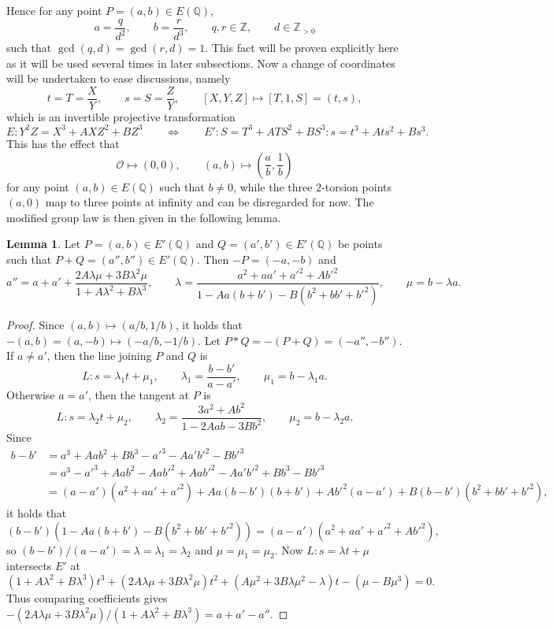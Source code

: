 \documentclass{article}
\newcommand{\Z}{\mathbb{Z}}
\newcommand{\Q}{\mathbb{Q}}
\newcommand{\rb}[1]{\left( #1 \right)}
\renewcommand{\sb}[1]{\left[ #1 \right]}
\theoremstyle{definition}\newtheorem*{definition}{Definition}
\theoremstyle{definition}\newtheorem*{example}{Example}
\theoremstyle{definition}\newtheorem*{remark}{Remark}
\newtheorem{lemma}[proposition]{Lemma}
\begin{document}
Hence for any point $ P = \rb{a, b} \in E\rb{\Q} $,
$$ a = \dfrac{q}{d^2}, \qquad b = \dfrac{r}{d^3}, \qquad q, r \in \Z, \qquad d \in \Z_{> 0} $$
such that $ \gcd\rb{q, d} = \gcd\rb{r, d} = 1 $. This fact will be proven explicitly here as it will be used several times in later subsections. Now a change of coordinates will be undertaken to ease discussions, namely
$$ t = T = \dfrac{X}{Y}, \qquad s = S = \dfrac{Z}{Y}, \qquad \sb{X, Y, Z} \mapsto \sb{T, 1, S} = \rb{t, s}, $$
which is an invertible projective transformation
$$ E : Y^2Z = X^3 + AXZ^2 + BZ^3 \qquad \iff \qquad E' : S = T^3 + ATS^2 + BS^3 : s = t^3 + Ats^2 + Bs^3. $$
This has the effect that
$$ \mathcal{O} \mapsto \rb{0, 0}, \qquad \rb{a, b} \mapsto \rb{\dfrac{a}{b}, \dfrac{1}{b}} $$
for any point $ \rb{a, b} \in E\rb{\Q} $ such that $ b \ne 0 $, while the three $ 2 $-torsion points $ \rb{a, 0} $ map to three points at infinity and can be disregarded for now. The modified group law is then given in the following lemma.

\begin{lemma}
Let $ P = \rb{a, b} \in E'\rb{\Q} $ and $ Q = \rb{a', b'} \in E'\rb{\Q} $ be points such that $ P + Q = \rb{a'', b''} \in E'\rb{\Q} $. Then $ -P = \rb{-a, -b} $ and
$$ a'' = a + a' + \dfrac{2A\lambda\mu + 3B\lambda^2\mu}{1 + A\lambda^2 + B\lambda^3}, \qquad \lambda = \dfrac{a^2 + aa' + a'^2 + Ab'^2}{1 - Aa\rb{b + b'} - B\rb{b^2 + bb' + b'^2}}, \qquad \mu = b - \lambda a. $$
\end{lemma}

\begin{proof}
Since $ \rb{a, b} \mapsto \rb{a / b, 1 / b} $, it holds that $ -\rb{a, b} = \rb{a, -b} \mapsto \rb{-a / b, -1 / b} $. Let $ P * Q = -\rb{P + Q} = \rb{-a'', -b''} $. If $ a \ne a' $, then the line joining $ P $ and $ Q $ is
$$ L : s = \lambda_1 t + \mu_1, \qquad \lambda_1 = \dfrac{b - b'}{a - a'}, \qquad \mu_1 = b - \lambda_1 a. $$
Otherwise $ a = a' $, then the tangent at $ P $ is
$$ L : s = \lambda_2 t + \mu_2, \qquad \lambda_2 = \dfrac{3a^2 + Ab^2}{1 - 2Aab - 3Bb^2}, \qquad \mu_2 = b - \lambda_2 a. $$
Since
\begin{align*}
b - b'
& = a^3 + Aab^2 + Bb^3 - a'^3 - Aa'b'^2 - Bb'^3 \\
& = a^3 - a'^3 + Aab^2 - Aab'^2 + Aab'^2 - Aa'b'^2 + Bb^3 - Bb'^3 \\
& = \rb{a - a'}\rb{a^2 + aa' + a'^2} + Aa\rb{b - b'}\rb{b + b'} + Ab'^2\rb{a - a'} + B\rb{b - b'}\rb{b^2 + bb' + b'^2},
\end{align*}
it holds that
$$ \rb{b - b'}\rb{1 - Aa\rb{b + b'} - B\rb{b^2 + bb' + b'^2}} = \rb{a - a'}\rb{a^2 + aa' + a'^2 + Ab'^2}, $$
so $ \rb{b - b'} / \rb{a - a'} = \lambda = \lambda_1 = \lambda_2 $ and $ \mu = \mu_1 = \mu_2 $. Now $ L : s = \lambda t + \mu $ intersects $ E' $ at
$$ \rb{1 + A\lambda^2 + B\lambda^3}t^3 + \rb{2A\lambda\mu + 3B\lambda^2\mu}t^2 + \rb{A\mu^2 + 3B\lambda\mu^2 - \lambda}t - \rb{\mu - B\mu^3} = 0. $$
Thus comparing coefficients gives $ -\rb{2A\lambda\mu + 3B\lambda^2\mu} / \rb{1 + A\lambda^2 + B\lambda^3} = a + a' - a'' $.
\end{proof}
\end{document}
